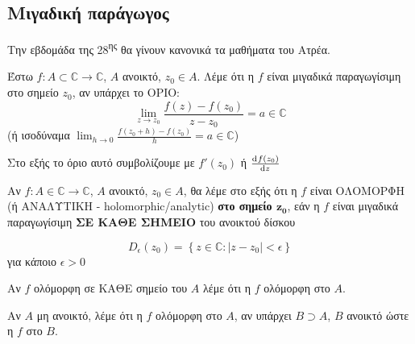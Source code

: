 \documentclass[12pt,a4paper,titlepage,fleqn]{article}
\begin{document}
    \subsection{Μιγαδική παράγωγος}
    Την εβδομάδα της 28\textsuperscript{ης} θα γίνουν κανονικά τα μαθήματα του
    Ατρέα.
    \begin{defn*}{}
       	Έστω \( f:A \subset \mathbb C \to \mathbb C  \), \( A \) ανοικτό,
       	\( z_0 \in A \). Λέμε ότι η \( f \) είναι μιγαδικά παραγωγίσιμη στο σημείο
       	\( z_0 \), αν υπάρχει το ΟΡΙΟ:
       	\[
       	\lim_{z\to z_0}
       	\frac{f(z)-f(z_0)}{z-z_0} = a \in \mathbb C 
       	\]
       	(ή ισοδύναμα \( \lim_{h\to0}\frac{f(z_0+h)-f(z_0)}{h}=a\in\mathbb C \))
       	
       	Στο εξής το όριο αυτό συμβολίζουμε με \( f'(z_0) \) ή
       	\( \od{f(z_0)}{z} \)
    \end{defn*}
    \begin{defn*}{}
       	Αν \( f:A\in\mathbb C\to\mathbb C \), \( A \) ανοικτό, \( z_0\in A \),
       	θα λέμε στο εξής ότι η \( f \) είναι ΟΛΟΜΟΡΦΗ (ή ΑΝΑΛΥΤΙΚΗ -
       	holomorphic/analytic)
       	\textbf{στο σημείο \( \mathbf{z_0} \)}, εάν η \( f \) είναι μιγαδικά
       	παραγωγίσιμη \textbf{ΣΕ ΚΑΘΕ ΣΗΜΕΙΟ} του ανοικτού δίσκου
       	\[
       	D_\epsilon(z_0) = \left\lbrace 
       	z\in\mathbb C: |z-z_0|<\epsilon
       	\right\rbrace
       	\]
       	για κάποιο \( \epsilon>0 \)
    \end{defn*}
    
    Αν \( f \) ολόμορφη σε ΚΑΘΕ σημείο του \( A \) λέμε ότι η \( f \) ολόμορφη στο
    \( A \).
    
    \begin{defn*}{}
       	Αν \( A \) μη ανοικτό, λέμε ότι η \( f \) ολόμορφη στο \( A \), αν
       	υπάρχει \( B \supset A \), \( B \) ανοικτό ώστε η \( f \) στο \( B \).
    \end{defn*}
    
\end{document}
